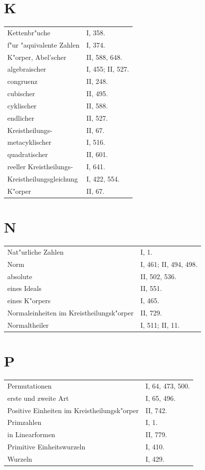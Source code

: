 \documentclass[10pt,a4paper]{article}
\theoremstyle{weberstyle}
\begin{document}
\section*{K}
\begin{flushleft}
\begin{tabular}{@{}p{8cm}l@{}}
Kettenbr"uche & I, 358.\\
\quad f"ur "aquivalente Zahlen & I, 374.\\[4pt]
K"orper, Abel'scher & II, 588, 648.\\
\quad algebraischer & I, 455; II, 527.\\
\quad congruenz & II, 248.\\
\quad cubischer & II, 495.\\
\quad cyklischer & II, 588.\\
\quad endlicher & II, 527.\\
\quad Kreistheilungs- & II, 67.\\
\quad metacyklischer & I, 516.\\
\quad quadratischer & II, 601.\\
\quad reeller Kreistheilungs- & I, 641.\\[4pt]
Kreistheilungsgleichung & I, 422, 554.\\
\quad K"orper & II, 67.
\end{tabular}
\end{flushleft}

\section*{N}
\begin{flushleft}
\begin{tabular}{@{}p{8cm}l@{}}
Nat"urliche Zahlen & I, 1.\\[4pt]
Norm & I, 461; II, 494, 498.\\
\quad absolute & II, 502, 536.\\
\quad eines Ideals & II, 551.\\
\quad eines K"orpers & I, 465.\\[4pt]
Normaleinheiten im Kreistheilungsk"orper & II, 729.\\[4pt]
Normaltheiler & I, 511; II, 11.
\end{tabular}
\end{flushleft}

\section*{P}
\begin{flushleft}
\begin{tabular}{@{}p{8cm}l@{}}
Permutationen & I, 64, 473, 500.\\
\quad erste und zweite Art & I, 65, 496.\\[4pt]
Positive Einheiten im Kreistheilungsk"orper & II, 742.\\[4pt]
Primzahlen & I, 1.\\
\quad in Linearformen & II, 779.\\[4pt]
Primitive Einheitswurzeln & I, 410.\\
\quad Wurzeln & I, 429.
\end{tabular}
\end{flushleft}
\end{document}
